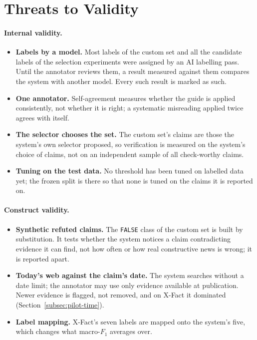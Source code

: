 
\section{Threats to Validity}
\label{sec:threats}

\paragraph{Internal validity.}
\begin{itemize}
    \item \textbf{Labels by a model.} Most labels of the custom set and
    all the candidate labels of the selection experiments were assigned
    by an AI labelling pass. Until the annotator reviews them, a
    result measured against them compares the system with another
    model. Every such result is marked as such.
    \item \textbf{One annotator.} Self-agreement measures whether the
    guide is applied consistently, not whether it is right; a
    systematic misreading applied twice agrees with itself.
    \item \textbf{The selector chooses the set.} The custom set's claims
    are those the system's own selector proposed, so verification is
    measured on the system's choice of claims, not on an independent
    sample of all check-worthy claims.
    \item \textbf{Tuning on the test data.} No threshold has been tuned
    on labelled data yet; the frozen split is there so that none is
    tuned on the claims it is reported on.
\end{itemize}

\paragraph{Construct validity.}
\begin{itemize}
    \item \textbf{Synthetic refuted claims.} The \texttt{FALSE} class of
    the custom set is built by substitution. It tests whether the system
    notices a claim contradicting evidence it can find, not how often or
    how real constructive news is wrong; it is reported apart.
    \item \textbf{Today's web against the claim's date.} The system
    searches without a date limit; the annotator may use only evidence
    available at publication. Newer evidence is flagged, not removed,
    and on X-Fact it dominated (Section~\ref{subsec:pilot-time}).
    \item \textbf{Label mapping.} X-Fact's seven labels are mapped onto
    the system's five, which changes what macro-$F_1$ averages over.
\end{itemize}


